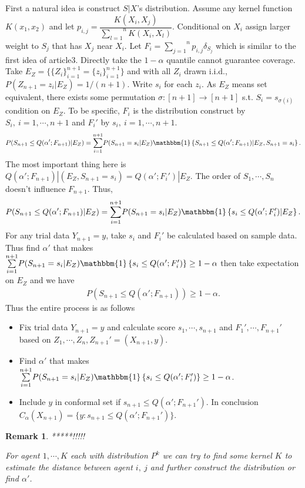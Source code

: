 \documentclass[12pt, a4paper, oneside]{article}
\newtheorem{remark}[theorem]{Remark}
\begin{document}
    
    First a natural idea is construct $S|X$'s distribution. Assume any kernel function $K(x_1,x_2)$ and let $p_{i,j}=\dfrac{K(X_i,X_j)}{\overset{n}{\underset{l=1}\sum}K(X_i,X_l)}$. Conditional on $X_i$ assign larger weight to $S_j$ that has $X_j$ near $X_i$. Let $F_i=\overset{n}{\underset{j=1}\sum}p_{i,j}\delta_{S_j}$ which is similar to the first idea of article3. Directly take the $1-\alpha$ quantile cannot guarantee coverage. Take $E_Z=\{\{Z_i\}_{i=1}^{n+1}=\{z_i\}_{i=1}^{n+1}\}$ and with all $Z_i$ drawn i.i.d., $P(Z_{n+1}=z_i|E_Z)=1/(n+1)$. Write $s_{i}$ for each $z_i$. As $E_Z$ means set equivalent, there exists some permutation $\sigma:[n+1]\rightarrow[n+1]$ s.t. $S_i=s_{\sigma(i)}$ condition on $E_Z$. To be specific, $F_i$ is the distribution construct by $S_i,\ i=1,\cdots,n+1$ and $F_i'$ by $s_i,\ i=1,\cdots,n+1$.
    \begin{align*}
        P(S_{n+1}\leq Q(\alpha';F_{n+1})|E_Z)=\overset{n+1}{\underset{i=1}\sum}P(S_{n+1}=s_i|E_Z)\mathbbm{1}\left\{ S_{n+1}\leq Q(\alpha';F_{n+1})|E_Z,S_{n+1}=s_i \right\}.
    \end{align*}
    The most important thing here is $Q(\alpha';F_{n+1})|(E_Z,S_{n+1}=s_i)=Q(\alpha';F_i')|E_Z$. The order of $S_1,\cdots,S_n$ doesn't influence $F_{n+1}$. Thus,
    \begin{align*}
        P(S_{n+1}\leq Q(\alpha';F_{n+1})|E_Z)=\overset{n+1}{\underset{i=1}\sum}P(S_{n+1}=s_i|E_Z)\mathbbm{1}\left\{ s_i\leq Q(\alpha';F_i')|E_Z \right\}.
    \end{align*}
    For any trial data $Y_{n+1}=y$, take $s_i$ and $F_i'$ be calculated based on sample data. Thus find $\alpha'$ that makes $\overset{n+1}{\underset{i=1}\sum}P(S_{n+1}=s_i|E_Z)\mathbbm{1}\left\{ s_i\leq Q(\alpha';F_i') \right\}\geq 1-\alpha$ then take expectation on $E_Z$ and we have
    \begin{align*}
        P(S_{n+1}\leq Q(\alpha';F_{n+1}))\geq 1-\alpha.
    \end{align*}
    Thus the entire process is as follows
    \begin{itemize}
        \item Fix trial data $Y_{n+1}=y$ and calculate score $s_1,\cdots,s_{n+1}$ and $F_1',\cdots,F_{n+1}'$ based on $Z_1,\cdots,Z_n,Z_{n+1}'=(X_{n+1},y)$.
        \item Find $\alpha'$ that makes $\overset{n+1}{\underset{i=1}\sum}P(S_{n+1}=s_i|E_Z)\mathbbm{1}\left\{ s_i\leq Q(\alpha';F_i') \right\}\geq 1-\alpha$.
        \item Include $y$ in conformal set if $s_{n+1}\leq Q(\alpha';F_{n+1}')$. In conclusion $C_\alpha(X_{n+1})=\{y:s_{n+1}\leq Q(\alpha';F_{n+1}')\}$.
    \end{itemize}
    \begin{remark}
        *****!!!!!


        For agent $1,\cdots,K$ each with distribution $P^k$ we can try to find some kernel $K$ to estimate the distance between agent $i,\ j$ and further construct the distribution or find $\alpha'$.
    \end{remark}
\newpage


\end{document}
